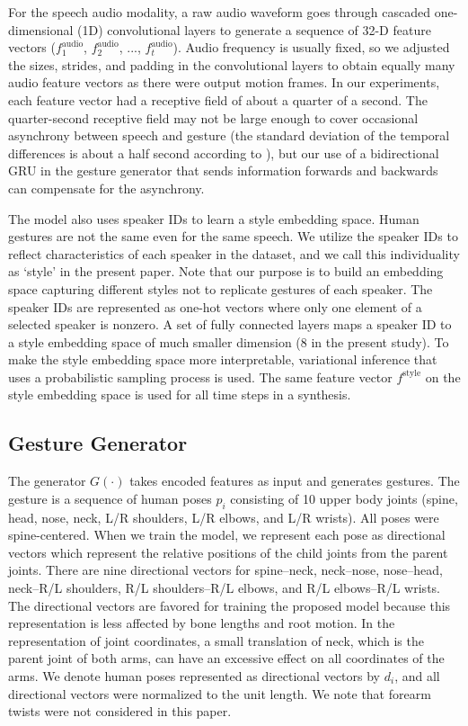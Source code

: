 \documentclass[acmtog]{acmart}
\begin{document}
For the speech audio modality, a raw audio waveform goes through cascaded one-dimensional (1D) convolutional layers to generate a sequence of 32-D feature vectors ($f_1^\textrm{audio}$, $f_2^\textrm{audio}$, ..., $f_t^\textrm{audio}$). Audio frequency is usually fixed, so we adjusted the sizes, strides, and padding in the convolutional layers to obtain equally many audio feature vectors as there were output motion frames. In our experiments, each feature vector had a receptive field of about a quarter of a second. The quarter-second receptive field may not be large enough to cover occasional asynchrony between speech and gesture (the standard deviation of the temporal
differences is about a half second according to \cite{bergmann2011relation}), but our use of a bidirectional GRU in the gesture generator that sends information forwards and backwards can compensate for the asynchrony.

The model also uses speaker IDs to learn a style embedding space. Human gestures are not the same even for the same speech. We utilize the speaker IDs to reflect characteristics of each speaker in the dataset, and we call this individuality as `style' in the present paper. Note that our purpose is to build an embedding space capturing different styles not to replicate gestures of each speaker. The speaker IDs are represented as one-hot vectors where only one element of a selected speaker is nonzero. A set of fully connected layers maps a speaker ID to a style embedding space of much smaller dimension (8 in the present study). To make the style embedding space more interpretable, variational inference \cite{kingma2013auto, rezende2014stochastic} that uses a probabilistic sampling process is used. The same feature vector $f^\textrm{style}$ on the style embedding space is used for all time steps in a synthesis.

\subsection{Gesture Generator}
The generator $G(\cdot)$ takes encoded features as input and generates gestures. The gesture is a sequence of human poses $p_i$ consisting of 10 upper body joints (spine, head, nose, neck, L/R shoulders, L/R elbows, and L/R wrists). All poses were spine-centered. When we train the model, we represent each pose as directional vectors which represent the relative positions of the child joints from the parent joints. There are nine directional vectors for spine--neck, neck--nose, nose--head, neck--R/L shoulders, R/L shoulders--R/L elbows, and R/L elbows--R/L wrists. The directional vectors are favored for training the proposed model because this representation is less affected by bone lengths and root motion. In the representation of joint coordinates, a small translation of neck, which is the parent joint of both arms, can have an excessive effect on all coordinates of the arms. We denote human poses represented as directional vectors by $d_i$, and all directional vectors were normalized to the unit length. We note that forearm twists were not considered in this paper.
\end{document}
